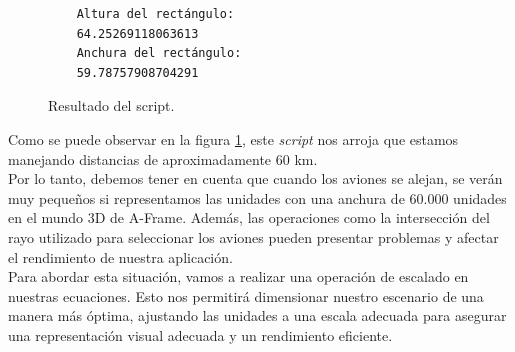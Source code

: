 \documentclass[a4paper, 11pt]{book}
\begin{document}
\begin{figure}[h]
	\centering
	\begin{verbatim}
	Altura del rectángulo:
	64.25269118063613
	Anchura del rectángulo:
	59.78757908704291
	\end{verbatim}
	\caption{Resultado del script.
	\label{codigo:resultadoDimensiones}
	}
\end{figure}
Como se puede observar en la figura \ref{codigo:resultadoDimensiones}, este \emph{script} nos arroja que estamos manejando distancias de aproximadamente 60 km. \\
Por lo tanto, debemos tener en cuenta que cuando los aviones se alejan, se verán muy pequeños si representamos las unidades con una anchura de 60.000 unidades en el mundo 3D de A-Frame. Además, las operaciones como la intersección del rayo utilizado para seleccionar los aviones pueden presentar problemas y afectar el rendimiento de nuestra aplicación.\\
Para abordar esta situación, vamos a realizar una operación de escalado en nuestras ecuaciones. Esto nos permitirá dimensionar nuestro escenario de una manera más óptima, ajustando las unidades a una escala adecuada para asegurar una representación visual adecuada y un rendimiento eficiente.
\end{document}
